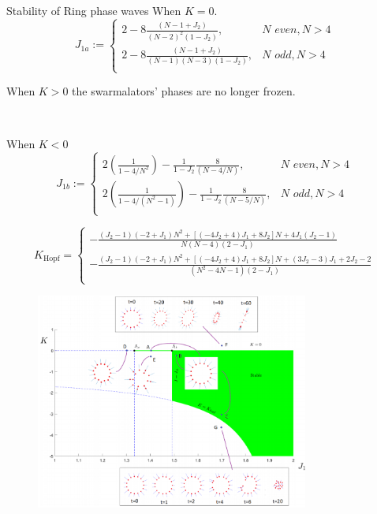 \documentclass[10pt,aspectratio=43,mathserif,table]{beamer}
\begin{document}
\begin{frame}{Stability of Ring phase waves}
    When $K = 0$.
    $$
    J_{1a}:=\begin{cases}
        2-8\frac{\left( N-1+J_2 \right)}{\left( N-2 \right) ^2\left( 1-J_2 \right)},&		N\,\,even, N>4\\
        2-8\frac{\left( N-1+J_2 \right)}{\left( N-1 \right) \left( N-3 \right) \left( 1-J_2 \right)},&		N\,\,odd, N>4\\
    \end{cases}
    $$


    When $K > 0$ the swarmalators’ phases are no longer frozen.
    
    $ $
    
    When $K < 0$
    $$
    J_{1b}:=\begin{cases}
        2\left( \frac{1}{1-4/N^2} \right) -\frac{1}{1-J_2}\frac{8}{\left( N-4/N \right)},&		N\,\,even, N>4\\
        2\left( \frac{1}{1-4/\left( N^2-1 \right)} \right) -\frac{1}{1-J_2}\frac{8}{\left( N-5/N \right)},&		N\,\,odd, N>4\\
    \end{cases}
    $$

    {
        \small
        $$
        K_{\mathrm{Hopf}}=\begin{cases}
            -\frac{\left( J_2-1 \right) \left( -2+J_1 \right) N^2+\left[ \left( -4J_2+4 \right) J_1+8J_2 \right] N+4J_1\left( J_2-1 \right)}{N\left( N-4 \right) \left( 2-J_1 \right)}\\
            -\frac{\left( J_2-1 \right) \left( -2+J_1 \right) N^2+\left[ \left( -4J_2+4 \right) J_1+8J_2 \right] N+\left( 3J_2-3 \right) J_1+2J_2-2}{\left( N^2-4N-1 \right) \left( 2-J_1 \right)}\\
        \end{cases}
        $$
    }
\end{frame}

\begin{frame}
    \begin{figure}
        \centering
        \includegraphics[width=0.8\textwidth]{f2.png}
    \end{figure}
\end{frame}
\end{document}
